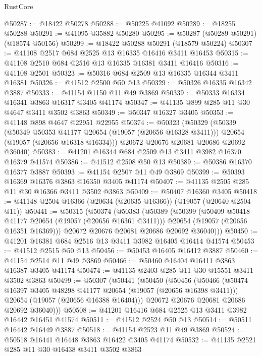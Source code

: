 \begin{lexlean}{RustCore}
\begin{coremodule}
@50287 := @18422 @50278
@50288 := @50225 @41092
@50289 := @18255 @50288
@50291 := @41095 @35882 @50280
@50295 := @50287 (@50289 @50291) (@18574 @50156)
@50299 := @18422 @50288 @50291 (@18579 @50224)
@50307 := @41108 @2517 @684 @2525 @13 @16335 @16416 @3411 @16453
@50315 := @41108 @2510 @684 @2516 @13 @16335 @16381 @3411 @16416
@50316 := @41108 @2501
@50323 := @50316 @684 @2509 @13 @16335 @16344 @3411 @16381
@50326 := @41512 @2500 @50 @13
@50329 := @50326 @16335 @16342 @3887
@50333 := @41154 @1150 @11 @49 @3869
@50339 := @50333 @16334 @16341 @3863 @16317 @3405 @41174
@50347 := @41135 @899 @285 @11 @30 @4647 @3411 @3502 @3863
@50349 := @50347 @16327 @3405
@50353 := @41148 @898 @4647 @22951 @22955
@50374 := @50323
    (@50329
      (@50339
        (@50349 @50353 @41177 @20654 (@19057 (@20656 @16328 @3411)))
        @20654
        (@19057 (@20656 @16318 @16334)))
      @20672
      @20676
      @20681
      @20686
      @20692
      @36040)
@50383 := @41201 @16344 @684 @2509 @13 @3411 @3982 @16370 @16379 @41574
@50386 := @41512 @2508 @50 @13
@50389 := @50386 @16370 @16377 @3887
@50393 := @41154 @2507 @11 @49 @3869
@50399 := @50393 @16369 @16376 @3863 @16350 @3405 @41174
@50407 := @41135 @2505 @285 @11 @30 @16366 @3411 @3502 @3863
@50409 := @50407 @16360 @3405
@50418 := @41148 @2504 @16366 (@20634 (@20635 @16366)) (@19057 (@20640 @2504 @11))
@50441 := @50315
    (@50374
      (@50383
        (@50389
          (@50399
            (@50409 @50418 @41177 @20654 (@19057 (@20656 @16361 @3411)))
            @20654
            (@19057 (@20656 @16351 @16369)))
          @20672
          @20676
          @20681
          @20686
          @20692
          @36040)))
@50450 := @41201 @16381 @684 @2516 @13 @3411 @3982 @16405 @16414 @41574
@50453 := @41512 @2515 @50 @13
@50456 := @50453 @16405 @16412 @3887
@50460 := @41154 @2514 @11 @49 @3869
@50466 := @50460 @16404 @16411 @3863 @16387 @3405 @41174
@50474 := @41135 @2403 @285 @11 @30 @15551 @3411 @3502 @3863
@50499 := @50307
    (@50441
      (@50450
        (@50456
          (@50466
            (@50474 @16397 @3405 @48298 @41177 @20654 (@19057 (@20656 @16398 @3411)))
            @20654
            (@19057 (@20656 @16388 @16404)))
          @20672
          @20676
          @20681
          @20686
          @20692
          @36040)))
@50508 := @41201 @16416 @684 @2525 @13 @3411 @3982 @16442 @16451 @41574
@50511 := @41512 @2524 @50 @13
@50514 := @50511 @16442 @16449 @3887
@50518 := @41154 @2523 @11 @49 @3869
@50524 := @50518 @16441 @16448 @3863 @16422 @3405 @41174
@50532 := @41135 @2521 @285 @11 @30 @16438 @3411 @3502 @3863

\end{coremodule}
\end{lexlean}
